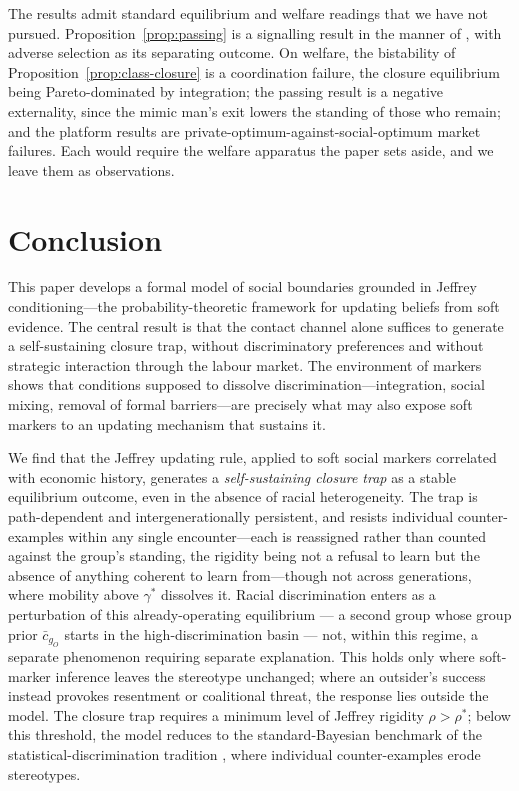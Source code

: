\documentclass[pdflatex,sn-basic]{sn-jnl}
\theoremstyle{thmstyleone}
\numberwithin{proposition}{subsection}
\begin{document}
The results admit standard equilibrium and welfare readings that we have
not pursued. Proposition~\ref{prop:passing} is a signalling result in the
manner of \citet{Spence1973}, with adverse selection as its separating
outcome. On welfare, the bistability of Proposition~\ref{prop:class-closure}
is a coordination failure, the closure equilibrium being Pareto-dominated
by integration; the passing result is a negative externality, since the
mimic man's exit lowers the standing of those who remain; and the platform
results are private-optimum-against-social-optimum market failures. Each
would require the welfare apparatus the paper sets aside, and we leave them
as observations.

\section{Conclusion}
\label{sec:conclusion}

This paper develops a formal model of social boundaries grounded
in Jeffrey conditioning---the probability-theoretic framework for
updating beliefs from soft evidence. The central result is that
the contact channel alone suffices to generate a self-sustaining
closure trap, without discriminatory preferences and without
strategic interaction through the labour market. The environment of markers shows that conditions
supposed to dissolve discrimination---integration, social mixing,
removal of formal barriers---are precisely what may also expose soft markers
to an updating mechanism that sustains it.

We find that the Jeffrey updating rule, applied to soft social
markers correlated with economic history, generates a
\emph{self-sustaining closure trap} as a stable equilibrium outcome,
even in the absence of racial heterogeneity. The trap is
path-dependent and intergenerationally persistent, and resists
individual counter-examples within any single encounter---each is
reassigned rather than counted against the group's standing, the rigidity
being not a refusal to learn but the absence of anything coherent to learn
from---though not across generations, where mobility above $\gamma^*$
dissolves it.
Racial discrimination enters as a perturbation of this already-operating
equilibrium --- a second group whose group prior $\bar{c}_{g_O}$
starts in the high-discrimination basin --- not, within this regime, a separate
phenomenon requiring separate explanation. This holds only where
soft-marker inference leaves the stereotype unchanged; where an
outsider's success instead provokes resentment or coalitional threat, the
response lies outside the model. The closure trap requires
a minimum level of Jeffrey rigidity $\rho > \rho^*$; below this
threshold, the model reduces to the standard-Bayesian benchmark of
the statistical-discrimination tradition
\citep{Phelps1972,Arrow1973}, where individual counter-examples
erode stereotypes.
\end{document}
